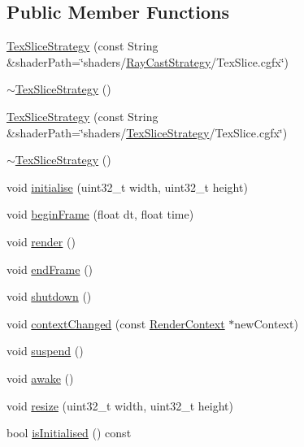 \subsection*{\-Public \-Member \-Functions}
\begin{DoxyCompactItemize}
\item 
\hyperlink{class_verdi_1_1_tex_slice_strategy_a966a67551420f96176c0734f79122c17}{\-Tex\-Slice\-Strategy} (const \-String \&shader\-Path=\char`\"{}shaders/\hyperlink{class_verdi_1_1_ray_cast_strategy}{\-Ray\-Cast\-Strategy}/\-Tex\-Slice.\-cgfx\char`\"{})
\item 
\hyperlink{class_verdi_1_1_tex_slice_strategy_a02727746e1ced6475b61033f6eb472da}{$\sim$\-Tex\-Slice\-Strategy} ()
\item 
\hyperlink{class_verdi_1_1_tex_slice_strategy_a7b925a79f5fab91a850a2d4ac89205ac}{\-Tex\-Slice\-Strategy} (const \-String \&shader\-Path=\char`\"{}shaders/\hyperlink{class_verdi_1_1_tex_slice_strategy}{\-Tex\-Slice\-Strategy}/\-Tex\-Slice.\-cgfx\char`\"{})
\item 
\hyperlink{class_verdi_1_1_tex_slice_strategy_a02727746e1ced6475b61033f6eb472da}{$\sim$\-Tex\-Slice\-Strategy} ()
\item 
void \hyperlink{class_verdi_1_1_tex_slice_strategy_abdbda056eafb1a428119ec5404a11204}{initialise} (uint32\-\_\-t width, uint32\-\_\-t height)
\item 
void \hyperlink{class_verdi_1_1_tex_slice_strategy_ad7ac71fe824de3ab082c66201b79a3bc}{begin\-Frame} (float dt, float time)
\item 
void \hyperlink{class_verdi_1_1_tex_slice_strategy_a6be673870c04b15179592e16d2ebbf60}{render} ()
\item 
void \hyperlink{class_verdi_1_1_tex_slice_strategy_aeb1f2291076b909e91c749924aa9f5f7}{end\-Frame} ()
\item 
void \hyperlink{class_verdi_1_1_tex_slice_strategy_aec405f9be90e4ee81a0cf0bd0e3d3935}{shutdown} ()
\item 
void \hyperlink{class_verdi_1_1_tex_slice_strategy_afcb1d4e8ca0aae9b0923fcc9772c1834}{context\-Changed} (const \hyperlink{class_verdi_1_1_render_context}{\-Render\-Context} $\ast$new\-Context)
\item 
void \hyperlink{class_verdi_1_1_tex_slice_strategy_abaf58e07219e1aab4d0016044da15f4d}{suspend} ()
\item 
void \hyperlink{class_verdi_1_1_tex_slice_strategy_a85eb6812293f248f92ec63f56dfaa5bb}{awake} ()
\item 
void \hyperlink{class_verdi_1_1_tex_slice_strategy_aa6d363ca6d668ea2c0d881dd181ab2ba}{resize} (uint32\-\_\-t width, uint32\-\_\-t height)
\item 
bool \hyperlink{class_verdi_1_1_tex_slice_strategy_ac5de87a3c2bab3838e0fa4ed546e611f}{is\-Initialised} () const 
\end{DoxyCompactItemize}
